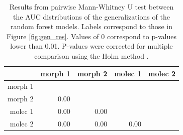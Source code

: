 \documentclass[12pt,letterpaper]{article}\usepackage{graphicx, color}
\begin{document}
\begin{table}
  \centering
\begin{tabular}{r|rrrr}
  & morph 1 & morph 2 & molec 1 & molec 2 \\ 
  \hline
morph 1 &  &  &  &  \\ 
  morph 2 & 0.00 &  &  &  \\ 
  molec 1 & 0.00 & 0.00 &  &  \\ 
  molec 2 & 0.00 & 0.00 & 0.00 &  \\ 
   \hline
\end{tabular}


  \caption{Results from pairwise Mann-Whitney U test between the AUC distributions of the generalizations of the random forest models. Labels correspond to those in Figure \ref{fig:gen_res}. Values of 0 correspond to p-values lower than 0.01. P-values were corrected for multiple comparison using the Holm method \citep{Holm1979}.}
  \label{tab:rf_test}
\end{table}
\end{document}
